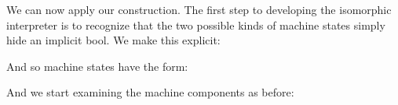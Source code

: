 \documentclass{llncs}
\begin{document}
{\begin{center}
\end{center}

We can now apply our construction. The first step to developing the
isomorphic interpreter is to recognize that the two possible kinds of machine
states simply hide an implicit {{bool}}. We make this explicit:


And so machine states have the form:


And we start examining the machine components as before:

\begin{center}
\end{center}

}
\end{document}
